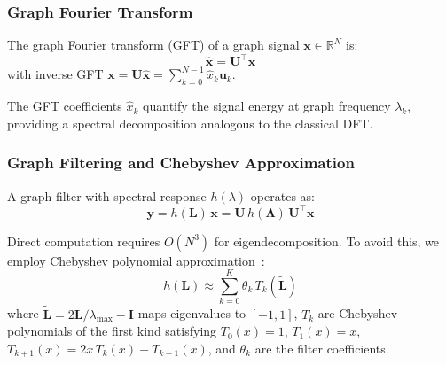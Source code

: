 \documentclass[sensors,article,submit,pdftex]{mdpi}
\newcommand{\vect}[1]{\boldsymbol{#1}}
\newcommand{\mat}[1]{\mathbf{#1}}
\newcommand{\R}{\mathbb{R}}
\begin{document}
\subsubsection{Graph Fourier Transform}
\begin{definition}
\label{def:gft}
The graph Fourier transform (GFT) of a graph signal $\vect{x} \in \R^N$ is:
\begin{equation}
    \hat{\vect{x}} = \mat{U}^\top \vect{x}
    \label{eq:gft}
\end{equation}
with inverse GFT $\vect{x} = \mat{U} \hat{\vect{x}} = \sum_{k=0}^{N-1} \hat{x}_k \vect{u}_k$.
\end{definition}

The GFT coefficients $\hat{x}_k$ quantify the signal energy at graph frequency $\lambda_k$, providing a spectral decomposition analogous to the classical DFT.

\subsubsection{Graph Filtering and Chebyshev Approximation}
A graph filter with spectral response $h(\lambda)$ operates as:
\begin{equation}
    \vect{y} = h(\mat{L})\, \vect{x} = \mat{U}\, h(\mat{\Lambda})\, \mat{U}^\top \vect{x}
    \label{eq:graph_filter}
\end{equation}

Direct computation requires $O(N^3)$ for eigendecomposition. To avoid this, we employ Chebyshev polynomial approximation~\cite{shuman2013}:
\begin{equation}
    h(\mat{L}) \approx \sum_{k=0}^{K} \theta_k\, T_k(\tilde{\mat{L}})
    \label{eq:chebyshev}
\end{equation}
where $\tilde{\mat{L}} = 2\mat{L}/\lambda_{\max} - \mat{I}$ maps eigenvalues to $[-1, 1]$, $T_k$ are Chebyshev polynomials of the first kind satisfying $T_0(x) = 1$, $T_1(x) = x$, $T_{k+1}(x) = 2x\,T_k(x) - T_{k-1}(x)$, and $\theta_k$ are the filter coefficients.
\end{document}
